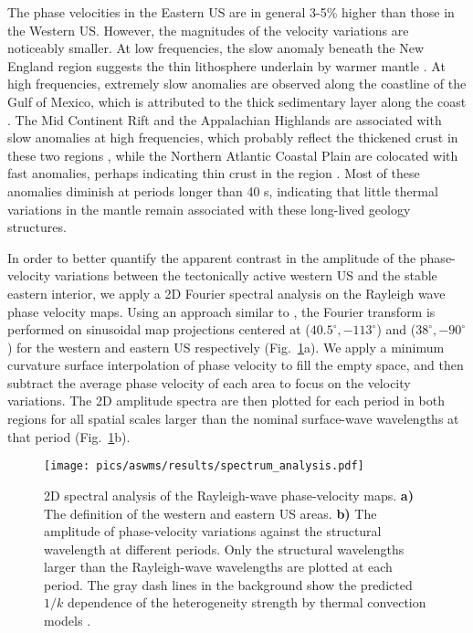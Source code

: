 The phase velocities in the Eastern US are in general 3-5\% higher than those in the Western US. However, the magnitudes of the velocity variations are noticeably smaller. 
At low frequencies, the slow anomaly beneath the New England region suggests the thin lithosphere underlain by warmer mantle \citep[e.g.,][]{Li:2002el,Gaherty:2004is,Rychert:2005cc}.
At high frequencies, extremely slow anomalies are observed along the coastline of the Gulf of Mexico, which is attributed to the thick sedimentary layer along the coast \citep{Laske:1997ug}. The Mid Continent Rift and the Appalachian Highlands are associated with slow anomalies at high frequencies, which probably reflect the thickened crust in these two regions \citep{Crotwell:2005iu,Shen:2013dd,Parker:2013ku}, while the Northern Atlantic Coastal Plain are colocated with fast anomalies, perhaps indicating thin crust in the region \citep{Crotwell:2005iu}. 
Most of these anomalies diminish at periods longer than 40 s, indicating that little thermal variations in the mantle remain associated with these long-lived geology structures. 


In order to better quantify the apparent contrast in the amplitude of the phase-velocity variations between the tectonically active western US and the stable eastern interior, 
we apply a 2D Fourier spectral analysis on the Rayleigh wave phase velocity maps. 
Using an approach similar to \citet{Chevrot:1998hm}, the Fourier transform is performed on sinusoidal map projections centered at ($40.5^\circ,-113^\circ$) and ($38^\circ,-90^\circ$) for the western and eastern US respectively (Fig.~\ref{fig:spectrum_analysis}a). We apply a minimum curvature surface interpolation of phase velocity to fill the empty space, and then subtract the average phase velocity of each area to focus on the velocity variations. The 2D amplitude spectra are then plotted for each period in both regions for all spatial scales larger than the nominal surface-wave wavelengths at that period (Fig.~\ref{fig:spectrum_analysis}b).


\begin{figure}
	\center
	\texttt{[image: pics/aswms/results/spectrum\_analysis.pdf]}
	\caption{2D spectral analysis of the Rayleigh-wave phase-velocity maps. \textbf{a)} The definition of the western and eastern US areas. \textbf{b)} The amplitude of phase-velocity variations against the structural wavelength at different periods. Only the structural wavelengths larger than the Rayleigh-wave wavelengths are plotted at each period. The gray dash lines in the background show the predicted $1/k$ dependence of the heterogeneity strength by thermal convection models \citep[e.g.,][]{Ricard:2014dv}.}
	\label{fig:spectrum_analysis}
\end{figure}




